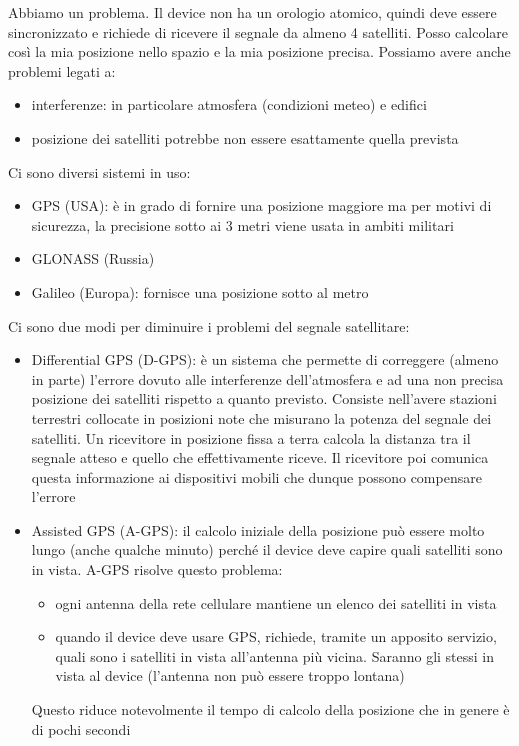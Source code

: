 Abbiamo un problema. Il device non ha un orologio atomico, quindi deve essere sincronizzato e richiede di ricevere il segnale da almeno 4 satelliti. Posso calcolare così la mia posizione nello spazio e la mia posizione precisa. 
Possiamo avere anche problemi legati a:
\begin{itemize}
    \item interferenze: in particolare atmosfera (condizioni meteo) e edifici 
    \item posizione dei satelliti potrebbe non essere esattamente quella prevista
\end{itemize}

Ci sono diversi sistemi in uso: 
\begin{itemize}
    \item GPS (USA): è in grado di fornire una posizione maggiore ma per motivi di sicurezza, la precisione sotto ai 3 metri viene usata in ambiti militari
    \item GLONASS (Russia)
    \item Galileo (Europa): fornisce una posizione sotto al metro
\end{itemize}

Ci sono due modi per diminuire i problemi del segnale satellitare:
\begin{itemize}
    \item Differential GPS (D-GPS): è un sistema che permette di correggere (almeno in parte) l'errore dovuto alle interferenze dell'atmosfera e ad una non precisa posizione dei satelliti rispetto a quanto previsto. Consiste nell'avere stazioni terrestri collocate in posizioni note che misurano la potenza del segnale dei satelliti. Un ricevitore in posizione fissa a terra calcola la distanza tra il segnale atteso e quello che effettivamente riceve. Il ricevitore poi comunica questa informazione ai dispositivi mobili che dunque possono compensare l'errore
    \item Assisted GPS (A-GPS): il calcolo iniziale della posizione può essere molto lungo (anche qualche minuto) perché il device deve capire quali satelliti sono in vista. A-GPS risolve questo problema:
    \begin{itemize}
        \item ogni antenna della rete cellulare mantiene un elenco dei satelliti in vista 
        \item quando il device deve usare GPS, richiede, tramite un apposito servizio, quali sono i satelliti in vista all'antenna più vicina. Saranno gli stessi in vista al device (l’antenna non può essere troppo lontana) 
    \end{itemize}
    Questo riduce notevolmente il tempo di calcolo della posizione che in genere è di pochi secondi
\end{itemize}

